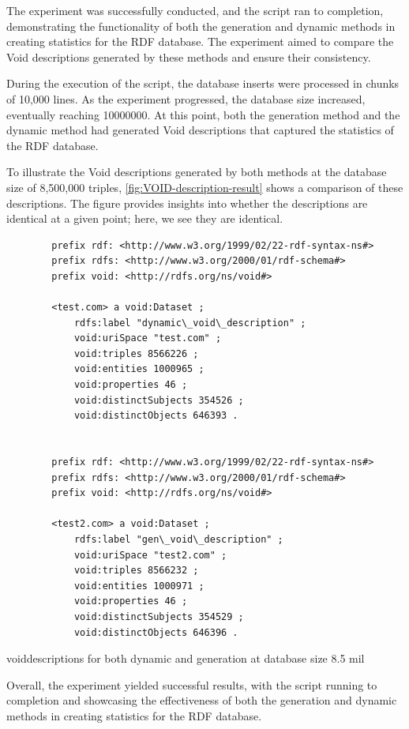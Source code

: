 The experiment was successfully conducted, and the script ran to completion, demonstrating the functionality of both the generation and dynamic methods in creating statistics for the RDF database. The experiment aimed to compare the Void descriptions generated by these methods and ensure their consistency.


During the execution of the script, the database inserts were processed in chunks of 10,000 lines. As the experiment progressed, the database size increased, eventually reaching 10000000. At this point, both the generation method and the dynamic method had generated Void descriptions that captured the statistics of the RDF database.


To illustrate the Void descriptions generated by both methods at the database size of 8,500,000 triples, \autoref*{fig:VOID-description-result} shows a comparison of these descriptions. The figure provides insights into whether the descriptions are identical at a given point; here, we see they are identical.


\begin{listing}[!ht]
    \begin{verbatim}
        prefix rdf: <http://www.w3.org/1999/02/22-rdf-syntax-ns#>
        prefix rdfs: <http://www.w3.org/2000/01/rdf-schema#>
        prefix void: <http://rdfs.org/ns/void#>
        
        <test.com> a void:Dataset ;
            rdfs:label "dynamic\_void\_description" ;
            void:uriSpace "test.com" ;
            void:triples 8566226 ;
            void:entities 1000965 ;
            void:properties 46 ;
            void:distinctSubjects 354526 ;
            void:distinctObjects 646393 .
        
        
        prefix rdf: <http://www.w3.org/1999/02/22-rdf-syntax-ns#>
        prefix rdfs: <http://www.w3.org/2000/01/rdf-schema#>
        prefix void: <http://rdfs.org/ns/void#>
        
        <test2.com> a void:Dataset ;
            rdfs:label "gen\_void\_description" ;
            void:uriSpace "test2.com" ;
            void:triples 8566232 ;
            void:entities 1000971 ;
            void:properties 46 ;
            void:distinctSubjects 354529 ;
            void:distinctObjects 646396 .
    \end{verbatim}
    \caption{voiddescriptions for both dynamic and generation at database size 8.5 mil}
    \label{fig:VOID-description-result}
\end{listing}
Overall, the experiment yielded successful results, with the script running to completion and showcasing the effectiveness of both the generation and dynamic methods in creating statistics for the RDF database. 










